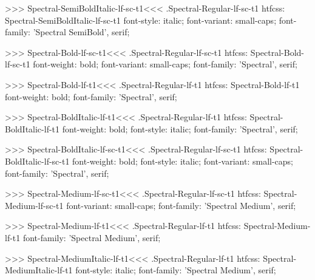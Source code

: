 >>>
\<Spectral-SemiBoldItalic-lf-sc-t1\><<<
.Spectral-Regular-lf-sc-t1
htfcss:  Spectral-SemiBoldItalic-lf-sc-t1  font-style: italic; font-variant: small-caps; font-family: 'Spectral SemiBold', serif;

>>>
\<Spectral-Bold-lf-sc-t1\><<<
.Spectral-Regular-lf-sc-t1
htfcss:  Spectral-Bold-lf-sc-t1  font-weight: bold; font-variant: small-caps; font-family: 'Spectral', serif;

>>>
\<Spectral-Bold-lf-t1\><<<
.Spectral-Regular-lf-t1
htfcss:  Spectral-Bold-lf-t1  font-weight: bold; font-family: 'Spectral', serif;

>>>
\<Spectral-BoldItalic-lf-t1\><<<
.Spectral-Regular-lf-t1
htfcss:  Spectral-BoldItalic-lf-t1  font-weight: bold; font-style: italic; font-family: 'Spectral', serif;

>>>
\<Spectral-BoldItalic-lf-sc-t1\><<<
.Spectral-Regular-lf-sc-t1
htfcss:  Spectral-BoldItalic-lf-sc-t1  font-weight: bold; font-style: italic; font-variant: small-caps; font-family: 'Spectral', serif;

>>>
\<Spectral-Medium-lf-sc-t1\><<<
.Spectral-Regular-lf-sc-t1
htfcss:  Spectral-Medium-lf-sc-t1  font-variant: small-caps; font-family: 'Spectral Medium', serif;

>>>
\<Spectral-Medium-lf-t1\><<<
.Spectral-Regular-lf-t1
htfcss:  Spectral-Medium-lf-t1  font-family: 'Spectral Medium', serif;

>>>
\<Spectral-MediumItalic-lf-t1\><<<
.Spectral-Regular-lf-t1
htfcss:  Spectral-MediumItalic-lf-t1  font-style: italic; font-family: 'Spectral Medium', serif;

